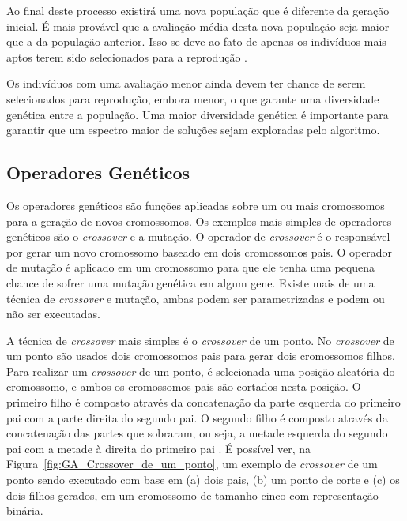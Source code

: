 \documentclass[12pt,oneside,a4paper,english,french,spanish,brazil,]{abntex2}
\begin{document}
Ao final deste processo existirá uma nova população que é diferente da geração inicial. É mais provável que a avaliação média desta nova população seja maior que a da população anterior. Isso se deve ao fato de apenas os indivíduos mais aptos terem sido selecionados para a reprodução \cite{linden:2008}.

Os indivíduos com uma avaliação menor ainda devem ter chance de serem selecionados para reprodução, embora menor, o que garante uma diversidade genética entre a população. Uma maior diversidade genética é importante para garantir que um espectro maior de soluções sejam exploradas pelo algoritmo.

\subsection{Operadores Genéticos}

Os operadores genéticos são funções aplicadas sobre um ou mais cromossomos para a geração de novos cromossomos. Os exemplos mais simples de operadores genéticos são o \textit{crossover} e a mutação. O operador de \textit{crossover} é o responsável por gerar um novo cromossomo baseado em dois cromossomos pais. O operador de mutação é aplicado em um cromossomo para que ele tenha uma pequena chance de sofrer uma mutação genética em algum gene. Existe mais de uma técnica de \textit{crossover} e mutação, ambas podem ser parametrizadas e podem ou não ser executadas.

A técnica de \textit{crossover} mais simples é o \textit{crossover} de um ponto. No \textit{crossover} de um ponto são usados dois cromossomos pais para gerar dois cromossomos filhos. Para realizar um \textit{crossover} de um ponto, é selecionada uma posição aleatória do cromossomo, e ambos os cromossomos pais são cortados nesta posição. O primeiro filho é composto através da concatenação da parte esquerda do primeiro pai com a parte direita do segundo pai. O segundo filho é composto através da concatenação das partes que sobraram, ou seja, a metade esquerda do segundo pai com a metade à direita do primeiro pai \cite{linden:2008}. É possível ver, na Figura~\ref{fig:GA_Crossover_de_um_ponto}, um exemplo de \textit{crossover}  de um ponto sendo executado com base em (a) dois pais, (b) um ponto de corte e (c) os dois filhos gerados, em um cromossomo de tamanho cinco com representação binária.
\end{document}
